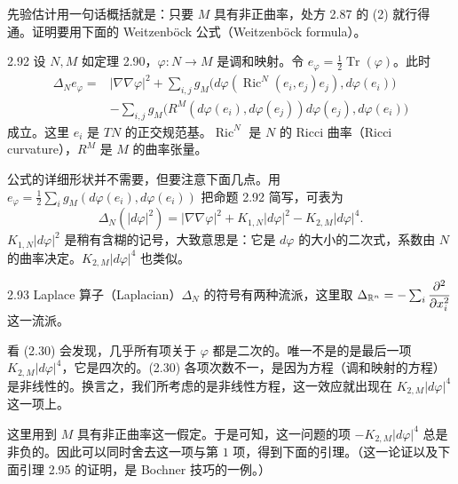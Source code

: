 先验估计用一句话概括就是：只要 $M$ 具有非正曲率，处方 2.87 的 (2) 就行得通。证明要用下面的 Weitzenböck 公式（Weitzenböck formula）。

\begin{proposition}{2.92}
  设 $N,M$ 如定理 2.90，$\varphi\colon N\to M$ 是调和映射。令 $e_\varphi=\frac12\operatorname{Tr}(\varphi)$。此时
  \[
  \begin{aligned}
    \Delta_Ne_\varphi={}&|\nabla\nabla\varphi|^2
    +\sum_{i,j}g_M\big(d\varphi(\operatorname{Ric}^N(e_i,e_j)e_j),d\varphi(e_i)\big)\\
    &-\sum_{i,j}g_M\big(R^M(d\varphi(e_i),d\varphi(e_j))d\varphi(e_j),d\varphi(e_i)\big)
  \end{aligned}
  \]
  成立。这里 $e_i$ 是 $TN$ 的正交规范基。$\operatorname{Ric}^N$ 是 $N$ 的 Ricci 曲率（Ricci curvature），$R^M$ 是 $M$ 的曲率张量。
\end{proposition}

公式的详细形状并不需要，但要注意下面几点。用 $e_\varphi=\frac12\sum_ig_M(d\varphi(e_i),d\varphi(e_i))$ 把命题 2.92 简写，可表为
\begin{equation}
  \Delta_N(|d\varphi|^2)=|\nabla\nabla\varphi|^2+K_{1,N}|d\varphi|^2-K_{2,M}|d\varphi|^4 . \tag{2.30}
\end{equation}
$K_{1,N}|d\varphi|^2$ 是稍有含糊的记号，大致意思是：它是 $d\varphi$ 的大小的二次式，系数由 $N$ 的曲率决定。$K_{2,M}|d\varphi|^4$ 也类似。

\begin{remark}{2.93}
   Laplace 算子（Laplacian）$\Delta_N$ 的符号有两种流派，这里取 $\Delta_{\mathbb{R}^n}=-\sum_i\dfrac{\partial^2}{\partial x_i^2}$ 这一流派。
\end{remark}


看 (2.30) 会发现，几乎所有项关于 $\varphi$ 都是二次的。唯一不是的是最后一项 $K_{2,M}|d\varphi|^4$，它是四次的。(2.30) 各项次数不一，是因为方程（调和映射的方程）是非线性的。换言之，我们所考虑的是非线性方程，这一效应就出现在 $K_{2,M}|d\varphi|^4$ 这一项上。

这里用到 $M$ 具有非正曲率这一假定。于是可知，这一问题的项 $-K_{2,M}|d\varphi|^4$ 总是非负的。因此可以同时舍去这一项与第 $1$ 项，得到下面的引理。（这一论证以及下面引理 2.95 的证明，是 Bochner 技巧的一例。）

